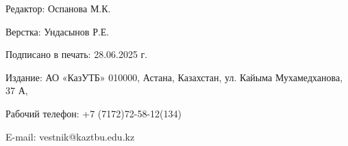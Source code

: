 \newpage

\thispagestyle{empty}
\null
\vfill
\begin{center}
Редактор: Оспанова М.К.

Верстка: Ундасынов Р.Е.

Подписано в печать: 28.06.2025 г.

Издание: АО «КазУТБ» 010000, Астана, Казахстан, ул. Кайыма Мухамедханова, 37 А,

Рабочий телефон: +7 (7172)72-58-12(134)

E-mail: vestnik@kaztbu.edu.kz
\end{center}
\vfill
\null
